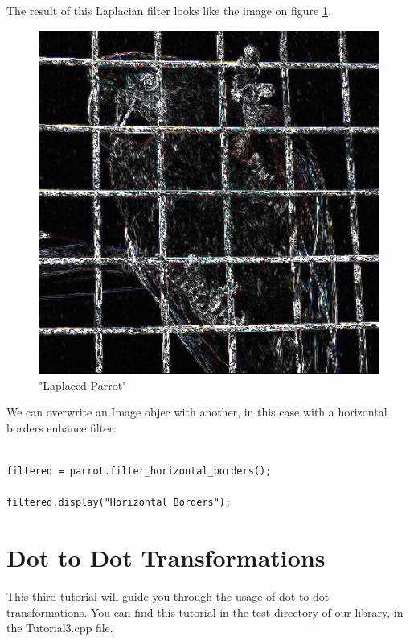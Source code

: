 \documentclass[a4paper]{article}
\begin{document}
The result of this Laplacian filter looks like the image on figure \ref{laplacian}.

\begin{figure}

\centering
\includegraphics[scale=0.5]{./.Multimedia/parrot_laplace.jpg}

\caption{"Laplaced Parrot"}
\label{laplacian}

\end{figure}

We can overwrite an Image objec with another, in this case with a horizontal borders enhance filter:

\begin{lstlisting}

filtered = parrot.filter_horizontal_borders();
	
filtered.display("Horizontal Borders");
\end{lstlisting}

\section{Dot to Dot Transformations}

This third tutorial will guide you through the usage of dot to dot transformations. You can find this tutorial in the test directory of our library, in the Tutorial3.cpp file.
\end{document}
